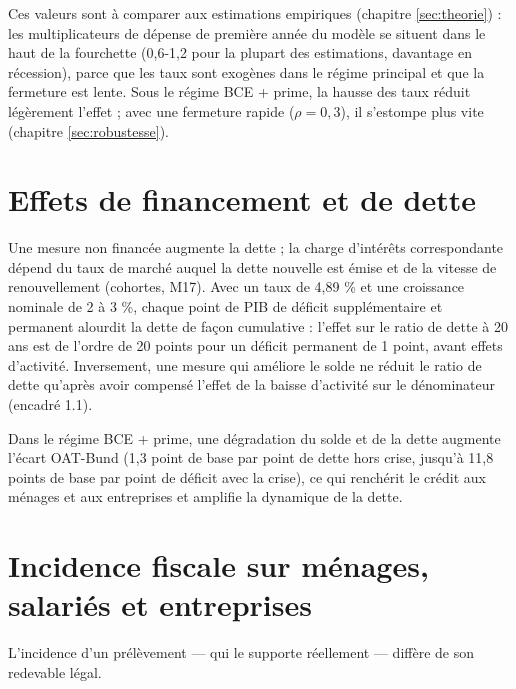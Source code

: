 \documentclass[
  11pt,
  11pt,
  a4paper,
  openany]{book}
\begin{document}
Ces valeurs sont à comparer aux estimations empiriques (chapitre
\ref{sec:theorie}) : les multiplicateurs de dépense de première année du
modèle se situent dans le haut de la fourchette (0,6-1,2 pour la plupart
des estimations, davantage en récession), parce que les taux sont
exogènes dans le régime principal et que la fermeture est lente. Sous le
régime BCE + prime, la hausse des taux réduit légèrement l'effet ; avec
une fermeture rapide (\(\rho = 0{,}3\)), il s'estompe plus vite
(chapitre \ref{sec:robustesse}).

\hypertarget{sec:financement}{%
\section{Effets de financement et de dette}\label{sec:financement}}

Une mesure non financée augmente la dette ; la charge d'intérêts
correspondante dépend du taux de marché auquel la dette nouvelle est
émise et de la vitesse de renouvellement (cohortes, M17). Avec un taux
de 4,89 \% et une croissance nominale de 2 à 3 \%, chaque point de PIB
de déficit supplémentaire et permanent alourdit la dette de façon
cumulative : l'effet sur le ratio de dette à 20 ans est de l'ordre de 20
points pour un déficit permanent de 1 point, avant effets d'activité.
Inversement, une mesure qui améliore le solde ne réduit le ratio de
dette qu'après avoir compensé l'effet de la baisse d'activité sur le
dénominateur (encadré 1.1).

Dans le régime BCE + prime, une dégradation du solde et de la dette
augmente l'écart OAT-Bund (1,3 point de base par point de dette hors
crise, jusqu'à 11,8 points de base par point de déficit avec la crise),
ce qui renchérit le crédit aux ménages et aux entreprises et amplifie la
dynamique de la dette.

\hypertarget{sec:incidence}{%
\section{Incidence fiscale sur ménages, salariés et
entreprises}\label{sec:incidence}}

L'incidence d'un prélèvement --- qui le supporte réellement --- diffère
de son redevable légal.
\end{document}

